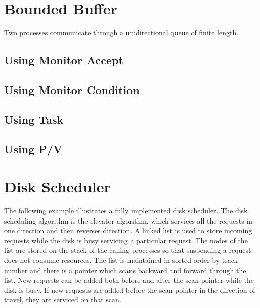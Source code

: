 \documentclass[openright,twoside]{report}
\begin{document}


\section{Bounded Buffer}
\label{s:BoundedBuffer}

Two processes communicate through a unidirectional queue of finite length.


\subsection{Using Monitor Accept}
\label{s:UsingMonitorAccept}



\subsection{Using Monitor Condition}
\label{s:UsingMonitorCondition}



\subsection{Using Task}
\label{s:UsingTask}



\subsection{Using P/V}
\label{s:UsingP/V}



\section{Disk Scheduler}
\label{s:DiskScheduler}

The following example illustrates a fully implemented disk scheduler.
The disk scheduling algorithm is the elevator algorithm, which services all the requests in one direction and then reverses direction.
A linked list is used to store incoming requests while the disk is busy servicing a particular request.
The nodes of the list are stored on the stack of the calling processes so that suspending a request does not consume resources.
The list is maintained in sorted order by track number and there is a pointer which scans backward and forward through the list.
New requests can be added both before and after the scan pointer while the disk is busy.
If new requests are added before the scan pointer in the direction of travel, they are serviced on that scan.
\end{document}
